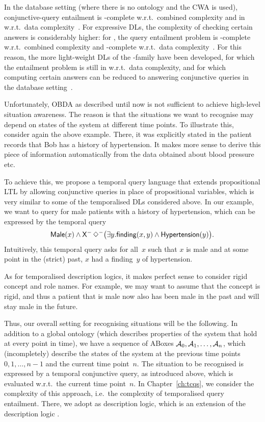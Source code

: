 In the database setting (where there is no ontology and the CWA is used),
conjunctive-query entailment is \NP-complete w.r.t.\ combined complexity and in
\ACzero w.r.t.\ data complexity~\cite{ChMe-STOC77,AbHV-95}.
For expressive DLs, the complexity of checking certain answers is considerably
higher: for \ALC, the query entailment problem is \ExpTime-complete w.r.t.\
combined complexity and \coNP-complete w.r.t.\ data
complexity~\cite{CaDL-PODS98,Lut-IJCAR08,CDL+-KR06}.  For this reason, the more
light-weight DLs of the \DLLite-family have been developed, for which the
entailment problem is still in \ACzero w.r.t.\ data complexity, and for which
computing certain answers can be reduced to answering conjunctive queries in the
database setting~\cite{CDL+-RW09}.

Unfortunately, OBDA as described until now is not sufficient to achieve
high-level situation awareness.  The reason is that the situations we want to
recognise may depend on states of the system at different time points.
%
To illustrate this, consider again the above example.  There, it was explicitly
stated in the patient records that Bob has a history of hypertension.  It makes
more sense to derive this piece of information automatically from the data
obtained about blood pressure etc.

To achieve this, we propose a temporal query language that extends propositional
LTL by allowing conjunctive queries in place of propositional variables, which
is very similar to some of the temporalised DLs considered above.
%
In our example, we want to query for male patients with a history of
hypertension, which can be expressed by the temporal query
\[\Male(x)\land\Previous\Diamondm\bigl(\exists y.\finding(x,y)\land\Hypertension(y)\bigr).\]
Intuitively, this temporal query asks for all~$x$ such that $x$ is male and at
some point in the (strict) past, $x$ had a finding~$y$ of hypertension.

As for temporalised description logics, it makes perfect sense to consider rigid
concept and role names.  For example, we may want to assume that the concept
\Male is rigid, and thus a patient that is male now also has been male in the
past and will stay male in the future.

Thus, our overall setting for recognising situations will be the following.  In
addition to a global ontology (which describes properties of the system
that hold at every point in time), we have a sequence of ABoxes
$\mathcal{A}_0,\mathcal{A}_1,\dots,\mathcal{A}_n$, which (incompletely) describe the
states of the system at the previous time points $0,1,\dots,n-1$ and the
current time point~$n$.  The situation to be recognised is expressed
by a temporal conjunctive query, as introduced above, which is evaluated w.r.t.\
the current time point~$n$.
%
In Chapter~\ref{ch:tcqs}, we consider the complexity of this approach, i.e.~the
complexity of temporalised query entailment.  There, we adopt \SHQ as
description logic, which is an extension of the description logic \ALC.


